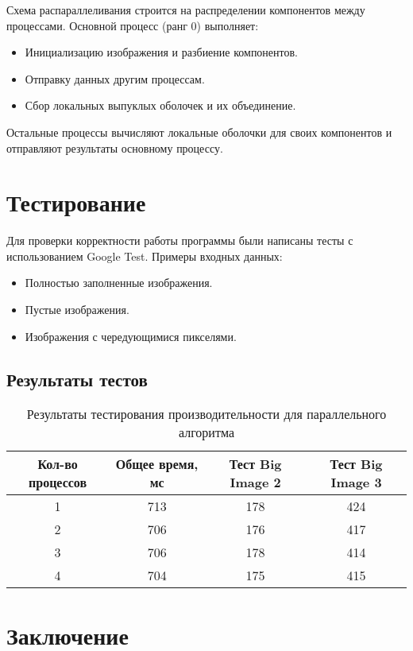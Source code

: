 \documentclass[a4paper,12pt]{article}
\begin{document}
\hspace*{1.25em}Схема распараллеливания строится на распределении компонентов между процессами. Основной процесс (ранг $0$) выполняет:
\begin{itemize}
    \item Инициализацию изображения и разбиение компонентов.
    \item Отправку данных другим процессам.
    \item Сбор локальных выпуклых оболочек и их объединение.
\end{itemize}
Остальные процессы вычисляют локальные оболочки для своих компонентов и отправляют результаты основному процессу.

\section{Тестирование}

\hspace*{1.25em}Для проверки корректности работы программы были написаны тесты с использованием Google Test. Примеры входных данных:
\begin{itemize}
    \item Полностью заполненные изображения.
    \item Пустые изображения.
    \item Изображения с чередующимися пикселями.
\end{itemize}

\subsection{Результаты тестов}
\begin{table}[H]
\centering
\begin{tabular}{cccc}
\toprule
\textbf{Кол-во процессов} & \textbf{Общее время, мс} & \textbf{Тест Big Image 2} & \textbf{Тест Big Image 3} \\
\midrule
1 & 713 & 178 & 424 \\
2 & 706 & 176 & 417 \\
3 & 706 & 178 & 414 \\
4 & 704 & 175 & 415 \\
\bottomrule
\end{tabular}
\caption{Результаты тестирования производительности для параллельного алгоритма}
\end{table}

\section{Заключение}
\end{document}
